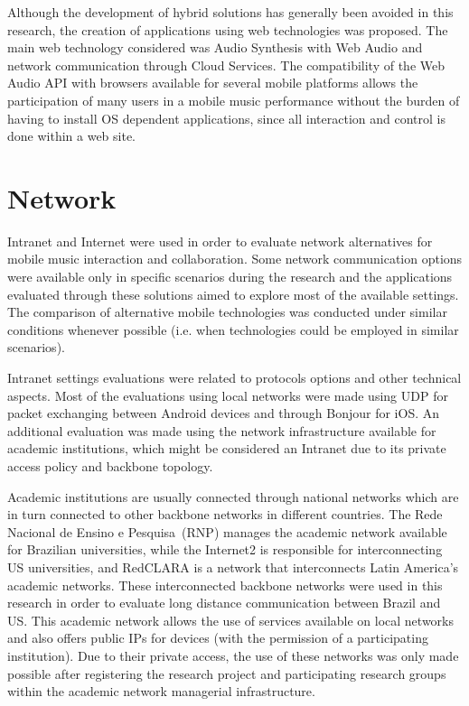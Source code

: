 Although the development of hybrid solutions has generally been avoided in this research, the creation of applications using web technologies was proposed.
The main web technology considered was Audio Synthesis with Web Audio and network communication through Cloud Services.
The compatibility of the Web Audio API with browsers available for several mobile platforms allows the participation of many users in a mobile music performance without the burden of having to install OS dependent applications, since all interaction and control is done within a web site.


\section{Network}

Intranet and Internet were used in order to evaluate network alternatives for mobile music interaction and collaboration.
Some network communication options were available only in specific scenarios during the research and the applications evaluated through these solutions aimed to explore most of the available settings.
The comparison of alternative mobile technologies was conducted under similar conditions whenever possible (i.e. when technologies could be employed in similar scenarios).

Intranet settings evaluations were related to protocols options and other technical aspects.
Most of the evaluations using local networks were made using UDP for packet exchanging between Android devices and through Bonjour for iOS.
An additional evaluation was made using the network infrastructure available for academic institutions, which might be considered an Intranet due to its private access policy and backbone topology.

Academic institutions are usually connected through national networks which are in turn connected to other backbone networks in different countries.
The Rede Nacional de Ensino e Pesquisa~(RNP) manages the academic network available for Brazilian universities, while the Internet2 is responsible for interconnecting US universities, and RedCLARA is a network that interconnects Latin America's academic networks.
These interconnected backbone networks were used in this research in order to evaluate long distance communication between Brazil and US.
This academic network allows the use of services available on local networks and also offers public IPs for devices (with the permission of a participating institution).
Due to their private access, the use of these networks was only made possible after registering the research project and participating research groups within the academic network managerial infrastructure.

